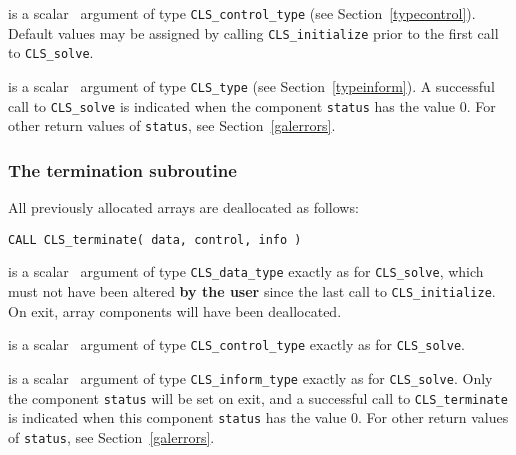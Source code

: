 \documentclass{galahad}
\newcommand{\packagename}{CLS}
\begin{document}
\begin{description}
 is a scalar \intentin\ argument of type 
{\tt \packagename\_control\_type}
(see Section~\ref{typecontrol}). Default values may be assigned by calling 
{\tt \packagename\_initialize} prior to the first call to 
{\tt \packagename\_solve}.

 is a scalar \intentout\ argument of type {\tt \packagename\_type}
(see Section~\ref{typeinform}). A successful call to
{\tt \packagename\_solve}
is indicated when the  component {\tt status} has the value 0. 
For other return values of {\tt status}, see Section~\ref{galerrors}.


\end{description}


\subsubsection{The  termination subroutine}
All previously allocated arrays are deallocated as follows:
\vspace*{1mm}

\hspace{8mm}
{\tt CALL \packagename\_terminate( data, control, info )}

\vspace*{-3mm}
\begin{description}

 is a scalar \intentinout\ argument of type 
{\tt \packagename\_data\_type} 
exactly as for
{\tt \packagename\_solve},
which must not have been altered {\bf by the user} since the last call to 
{\tt \packagename\_initialize}.
On exit, array components will have been deallocated.

 is a scalar \intentin\ argument of type 
{\tt \packagename\_control\_type}
exactly as for
{\tt \packagename\_solve}.

 is a scalar \intentout\ argument of type
{\tt \packagename\_inform\_type}
exactly as for
{\tt \packagename\_solve}.
Only the component {\tt status} will be set on exit, and a 
successful call to 
{\tt \packagename\_terminate}
is indicated when this  component {\tt status} has the value 0. 
For other return values of {\tt status}, see Section~\ref{galerrors}.

\end{description}
\end{document}

